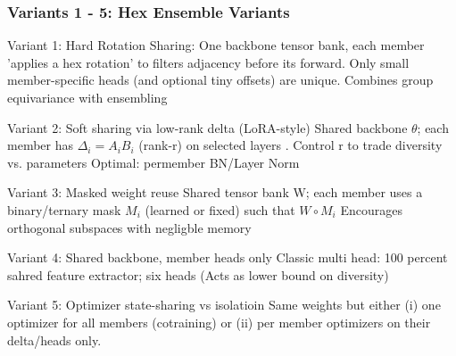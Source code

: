 \subsubsection{Variants 1 - 5: Hex Ensemble Variants}
Variant 1: Hard Rotation Sharing:
One backbone tensor bank, each member 'applies a hex rotation' to filters adjacency before its forward.
Only small member-specific heads (and optional tiny offsets) are unique.
Combines group equivariance with ensembling

Variant 2: Soft sharing via low-rank delta (LoRA-style)
Shared backbone $\theta$; each member has $\Delta_i = A_iB_i$ (rank-r) on selected layers \cite{hu2022lora}.
Control r to trade diversity vs. parameters
Optimal: permember BN/Layer Norm

Variant 3: Masked weight reuse
Shared tensor bank W; each member uses a binary/ternary mask $M_i$ (learned or fixed) such that $W \circ M_i$
Encourages orthogonal subspaces with negligble memory

Variant 4: Shared backbone, member heads only
Classic multi head: 100 percent sahred feature extractor; six heads (Acts as lower bound on diversity)

Variant 5: Optimizer state-sharing vs isolatioin
Same weights but either (i) one optimizer for all members (cotraining) or (ii) per member optimizers on their delta/heads only.

